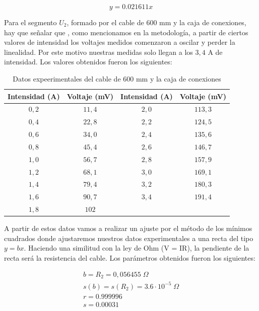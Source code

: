 \documentclass[a4paper,12pt,titlepage]{report}
\begin{document}
\begin{equation}
    y = 0.021611x
\end{equation}

Para el segmento $U_{2}$, formado por el cable de 600 mm y la caja de conexiones, hay que señalar que , como mencionamos en la metodología, a partir de ciertos valores de intensidad los voltajes medidos comenzaron a oscilar y perder la linealidad. Por este motivo nuestras medidas solo llegan a los $3,4$ A de intensidad. Los valores obtenidos fueron los siguientes:

\begin{table}[h!]
    \centering
    \begin{tabular}{|c|c|c|c|}
        \hline
        Intensidad (A) & Voltaje (mV) & Intensidad (A) & Voltaje (mV) \\
        \hline
        $0,2$ & $11,4$ & $2,0$ & $113,3$ \\
        \hline
        $0,4$ & $22,8$ & $2,2$ & $124,5$ \\
        \hline
        $0,6$ & $34,0$ & $2,4$ & $135,6$ \\
        \hline
        $0,8$ & $45,4$ & $2,6$ & $146,7$ \\
        \hline
        $1,0$ & $56,7$ & $2,8$ & $157,9$ \\
        \hline
        $1,2$ & $68,1$ & $3,0$ & $169,1$ \\
        \hline
        $1,4$ & $79,4$ & $3,2$ & $180,3$ \\
        \hline
        $1,6$ & $90,7$ & $3,4$ & $191,4$ \\
        \hline
        $1,8$ & $102$ &  &  \\
        \hline
    \end{tabular}
    \caption{Datos expeerimentales del cable de 600 mm y la caja de conexiones}
\end{table}

A partir de estos datos vamos a realizar un ajuste por el método de los mínimos cuadrados donde ajustaremos nuestros datos experimentales a una recta del tipo $y = bx$. Haciendo una similitud con la ley de Ohm (V = IR), la pendiente de la recta será la resistencia del cable. Los parámetros obtenidos fueron los siguientes:

\begin{equation}
    \begin{gathered}
        b = R_{2} = 0,056455 \; \Omega \\
        s(b) = s(R_{2}) = 3.6 \cdot 10^{-5} \; \Omega \\
        r =  0.999996 \\
        s =  0.00031
    \end{gathered}
\end{equation}
\end{document}
